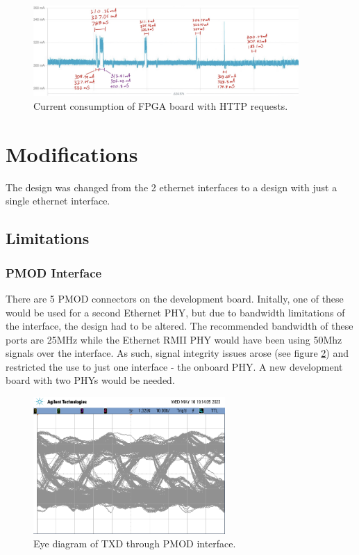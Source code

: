 \begin{figure}[h]
    \centering
    \includegraphics[width=0.9\textwidth]{Images/PPK_http_annotated.png}
    \caption[Current consumption of FPGA board with HTTP requests]{Current consumption of FPGA board with HTTP requests.}
    \label{fig:ppk_http_annotated}
\end{figure}













\section{Modifications}
The design was changed from the 2 ethernet interfaces to a design with just a single ethernet interface. 
\subsection{Limitations}
\subsubsection{PMOD Interface}

There are 5 PMOD connectors on the development board. Initally, one of these would be used for a second Ethernet PHY, but due to bandwidth limitations of the interface, the design had to be altered. The recommended bandwidth of these ports are 25MHz while the Ethernet RMII PHY would have been using 50Mhz signals over the interface. As such, signal integrity issues arose (see figure \ref{fig:eye_diagram}) and restricted the use to just one interface - the onboard PHY. A new development board with two PHYs would be needed.

\begin{figure}[h]
    \centering
    \includegraphics[width=0.65\textwidth]{Images/EyeDiagramTX.png}
    \caption[Eye diagram of TXD through PMOD interface]{Eye diagram of TXD through PMOD interface.}
    \label{fig:eye_diagram}
\end{figure}